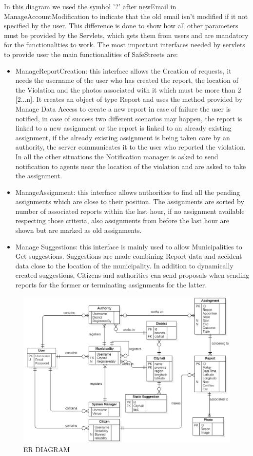In this diagram we used the symbol ’?’ after newEmail in ManageAccountModification to indicate that
the old email isn’t modified if it not specified by the user. This difference is done to show how all
other parameters must be provided by the Servlets, which gets them from users and are mandatory for
the functionalities to work. The most important interfaces needed by servlets to provide user the main
functionalities of SafeStreets are:
\begin{itemize}
\item ManageReportCreation: this interface allows the Creation of requests, it needs the username of the user who has created the report, the location of the Violation and the photos associated with it which must be more than 2 [2...n]. It creates an object of type Report and uses the method provided by Manage Data
Access to create a new report in case of failure the user is notified, in case of success two different
scenarios may happen, the report is linked to a new assignment or the report is linked to an
already existing assignment, if the already existing assignment is being taken care by an authority,
the server communicates it to the user who reported the violation. In all the other situations the Notification manager is asked to send notification to agents near the location of the violation and are asked to take the assignment.
\item ManageAssignment: this interface allows authorities to find all the pending assignments which
are close to their position. The assignments are sorted by number of associated reports within the
last hour, if no assignment available respecting those criteria, also assignments from before the last
hour are shown but are marked as old assignments.
\item Manage Suggestions: this interface is mainly used to allow Municipalities to Get suggestions.
Suggestions are made combining Report data and accident data close to the location of the municipality.
In addition to dynamically created suggestions, Citizens and authorities can send
proposals when sending reports for the former or terminating assignments for the latter.

\end{itemize}
\begin{figure}[H]
\centering
\includegraphics[width=\textwidth]{Images/ER.png}
\caption{\label{fig:ComWI}ER DIAGRAM }
\end{figure}
